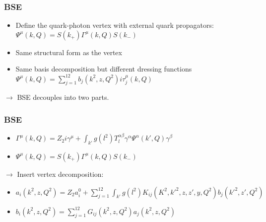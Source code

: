 \begin{frame}
    \frametitle{BSE}
    \begin{itemize}
        \item Define the quark-photon vertex with external quark propagators:\\
        $\Psi^{\mu}(k, Q) = S(k_+) \Gamma^{\mu}(k,Q)S(k_-)$
        \item Same structural form as the vertex
        \item Same basis decomposition but different dressing functions \\
        $\Psi^{\mu}(k, Q) = \sum_{j = 1}^{12}b_j(k^2,z,Q^2)i \tau_j^{\mu}(k,Q)$
    \end{itemize}

    $\longrightarrow $ BSE decouples into two parts.

\end{frame}

\begin{frame}
    \frametitle{BSE}


    \begin{itemize}
        \item $\Gamma^{\mu}(k,Q) = Z_2 i \gamma^{\mu} + \int_{k'}g(l^2) T_l^{\alpha \beta} \gamma^{\alpha} \Psi^{\alpha}(k',Q) \gamma^{\beta}$
        \item $\Psi^{\mu}(k, Q) = S(k_+) \Gamma^{\mu}(k,Q)S(k_-)$
    \end{itemize}
    $\rightarrow$ Insert vertex decomposition:
    \begin{itemize}
        \item $a_i(k^2,z,Q^2) = Z_2 a_i^0 + \sum_{j = 1}^{12} \int_{k'}g(l^2) K_{ij}(K^2,k'^2,z,z',y,Q^2)b_j(k'^2,z',Q^2)$
        \item $b_i(k^2,z,Q^2) = \sum_{j=1}^{12} G_{ij}(k^2,z,Q^2)a_j(k^2,z,Q^2)$
    \end{itemize}

\end{frame}

\endinput
